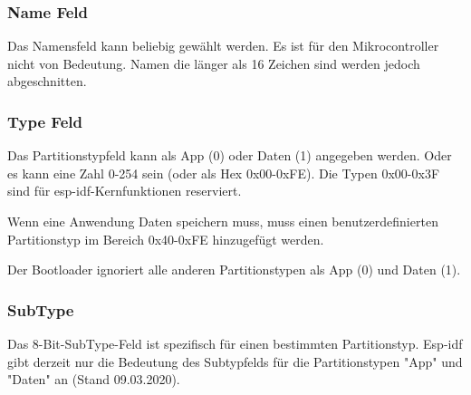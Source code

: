 \subsubsection{Name Feld}
Das Namensfeld kann beliebig gewählt werden. Es ist für den Mikrocontroller nicht von Bedeutung. Namen die länger als 16 Zeichen sind werden jedoch abgeschnitten.

\subsubsection{Type Feld}
Das Partitionstypfeld kann als App (0) oder Daten (1) angegeben werden. Oder es kann eine Zahl 0-254 sein (oder als Hex 0x00-0xFE). Die Typen 0x00-0x3F sind für esp-idf-Kernfunktionen reserviert.

Wenn eine Anwendung Daten speichern muss, muss einen benutzerdefinierten Partitionstyp im Bereich 0x40-0xFE hinzugefügt werden.

Der Bootloader ignoriert alle anderen Partitionstypen als App (0) und Daten (1).

\subsubsection{SubType}
Das 8-Bit-SubType-Feld ist spezifisch für einen bestimmten Partitionstyp. Esp-idf gibt derzeit nur die Bedeutung des Subtypfelds für die Partitionstypen "App" und "Daten" an (Stand 09.03.2020).


